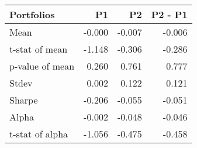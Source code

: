 \begin{tabular}{lrrr}
\toprule
Portfolios & P1 & P2 & P2 - P1 \\
\midrule
Mean & -0.000 & -0.007 & -0.006 \\
t-stat of mean & -1.148 & -0.306 & -0.286 \\
p-value of mean & 0.260 & 0.761 & 0.777 \\
Stdev & 0.002 & 0.122 & 0.121 \\
Sharpe & -0.206 & -0.055 & -0.051 \\
Alpha & -0.002 & -0.048 & -0.046 \\
t-stat of alpha & -1.056 & -0.475 & -0.458 \\
\bottomrule
\end{tabular}
